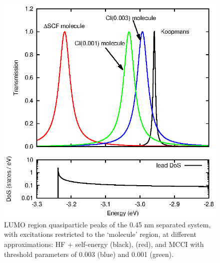\begin{figure}
	\begin{center}
		\includegraphics[width=0.9\linewidth]{figures/figure5a_5b}
	\end{center}
	\caption{LUMO region quasiparticle peaks of the 0.45 nm separated
	         system, with excitations restricted to the `molecule' region,
		 at different approximations: HF + self-energy (black),
		 \dscf (red), and MCCI with threshold parameters of
		 0.003 (blue) and 0.001 (green).}
	\label{fig:all45Alumo}
\end{figure}


